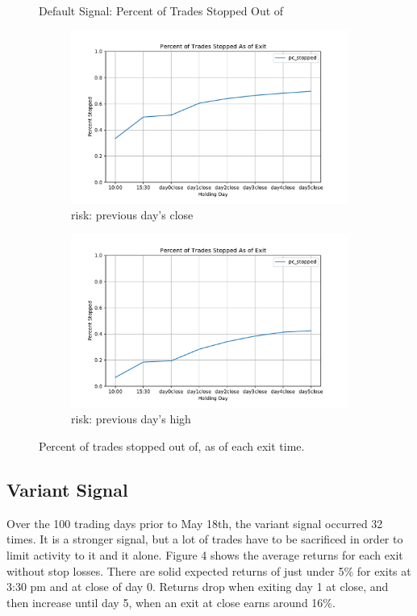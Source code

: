 \documentclass{article}
\begin{document}
\begin{figure}
\centering
Default Signal: Percent of Trades Stopped Out of
\begin{subfigure}{\linewidth}
  \centering
  \includegraphics[width=\linewidth]{pc_stop_risk_close.pdf}
  \caption{risk: previous day's close}
\end{subfigure}
\begin{subfigure}{\linewidth}
  \centering
  \includegraphics[width=\linewidth]{pc_stop_risk_high.pdf}
  \caption{risk: previous day's high}
\end{subfigure}
\caption{Percent of trades stopped out of, as of each exit time.}
\end{figure}

\subsection{Variant Signal}

Over the 100 trading days prior to May 18th, the variant signal occurred 32 times. It is a stronger signal, but a lot of trades have to be sacrificed in order to limit activity to it and it alone. Figure 4 shows the average returns for each exit without stop losses. There are solid expected returns of just under 5\% for exits at 3:30 pm and at close of day 0. Returns drop when exiting day 1 at close, and then increase until day 5, when an exit at close earns around 16\%.
\end{document}
